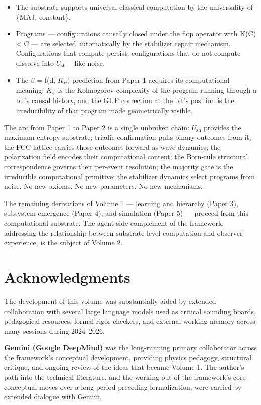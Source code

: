 \documentclass[11pt,oneside]{report}
\theoremstyle{definition}
\theoremstyle{remark}
\begin{document}
\begin{itemize}
\item
  The substrate supports universal classical computation by the
  universality of \{MAJ, constant\}.
\item
  Programs --- configurations causally closed under the flop operator
  with K(C) \textless{} \textbar C\textbar{} --- are selected
  automatically by the stabilizer repair mechanism. Configurations that
  compute persist; configurations that do not compute dissolve into
  \ensuremath{U_{\mathrm{sh}}-\text{like}} noise.
\item
  The \ensuremath{\beta} = f(d, \ensuremath{K_{\psi})} prediction from Paper 1 acquires its computational
  meaning: \ensuremath{K_{\psi}} is the Kolmogorov complexity of the program running
  through a bit's causal history, and the GUP correction at the bit's
  position is the irreducibility of that program made geometrically
  visible.
\end{itemize}

The arc from Paper 1 to Paper 2 is a single unbroken chain: \ensuremath{U_{\mathrm{sh}}} provides
the maximum-entropy substrate; triadic confirmation pulls binary
outcomes from it; the FCC lattice carries those outcomes forward as wave
dynamics; the polarization field encodes their computational content;
the Born-rule structural correspondence governs their per-event
resolution; the majority gate is the irreducible computational
primitive; the stabilizer dynamics select programs from noise. No new
axioms. No new parameters. No new mechanisms.

The remaining derivations of Volume 1 --- learning and hierarchy (Paper
3), subsystem emergence (Paper 4), and simulation (Paper 5) --- proceed
from this computational substrate. The agent-side complement of the
framework, addressing the relationship between substrate-level
computation and observer experience, is the subject of Volume 2.

\section*{Acknowledgments}

The development of this volume was substantially aided by extended
collaboration with several large language models used as critical
sounding boards, pedagogical resources, formal-rigor checkers, and
external working memory across many sessions during 2024--2026.

\textbf{Gemini (Google DeepMind)} was the long-running primary
collaborator across the framework's conceptual development, providing
physics pedagogy, structural critique, and ongoing review of the ideas
that became Volume 1. The author's path into the technical literature,
and the working-out of the framework's core conceptual moves over a long
period preceding formalization, were carried by extended dialogue with
Gemini.
\end{document}
